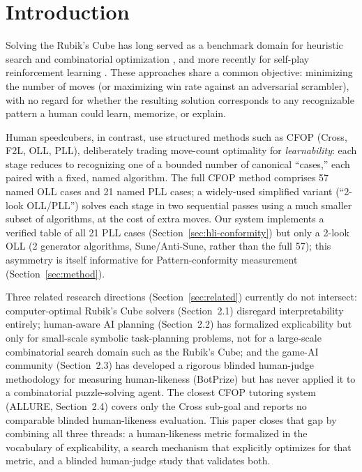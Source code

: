 \documentclass[10pt,conference]{article}
\begin{document}
\section{Introduction}

Solving the Rubik's Cube has long served as a benchmark domain for
heuristic search and combinatorial optimization
\citep{korf1997,rokicki2014}, and more recently for
self-play reinforcement learning \citep{mcaleer2018}. These
approaches share a common objective: minimizing the number of moves
(or maximizing win rate against an adversarial scrambler), with no
regard for whether the resulting solution corresponds to any
recognizable pattern a human could learn, memorize, or explain.

Human speedcubers, in contrast, use structured methods such as CFOP
(Cross, F2L, OLL, PLL), deliberately trading move-count optimality
for \emph{learnability}: each stage reduces to recognizing one of a
bounded number of canonical ``cases,'' each paired with a fixed,
named algorithm. The full CFOP method comprises 57 named OLL cases
and 21 named PLL cases; a widely-used simplified variant
(``2-look OLL/PLL'') solves each stage in two sequential passes using
a much smaller subset of algorithms, at the cost of extra moves. Our
system implements a verified table of all 21 PLL cases
(Section~\ref{sec:hli-conformity}) but only a 2-look OLL
(2 generator algorithms, Sune/Anti-Sune, rather than the full 57);
this asymmetry is itself informative for Pattern-conformity
measurement (Section~\ref{sec:method}).

Three related research directions (Section~\ref{sec:related}) currently
do not intersect: computer-optimal Rubik's Cube solvers (Section~2.1)
disregard interpretability entirely; human-aware AI planning
(Section~2.2) has formalized explicability but only for small-scale
symbolic task-planning problems, not for a large-scale combinatorial
search domain such as the Rubik's Cube; and the game-AI community
(Section~2.3) has developed a rigorous blinded human-judge methodology
for measuring human-likeness (BotPrize) but has never applied it to a
combinatorial puzzle-solving agent. The closest CFOP tutoring system
(ALLURE, Section~2.4) covers only the Cross sub-goal and reports no
comparable blinded human-likeness evaluation. This paper closes that
gap by combining all three threads: a human-likeness metric formalized
in the vocabulary of explicability, a search mechanism that explicitly
optimizes for that metric, and a blinded human-judge study that
validates both.
\end{document}
